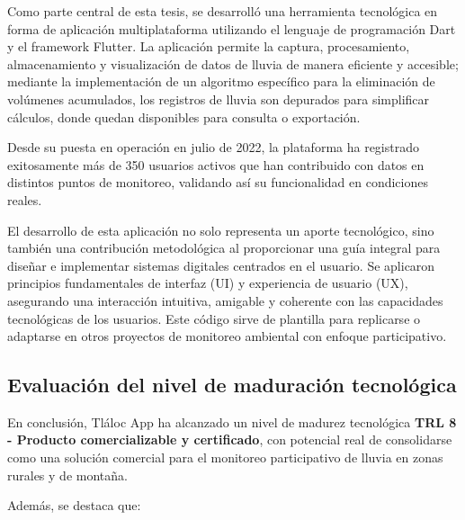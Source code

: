 Como parte central de esta tesis, se desarrolló una herramienta tecnológica en forma de aplicación multiplataforma utilizando el lenguaje de programación Dart y el framework Flutter. La aplicación permite la captura, procesamiento, almacenamiento y visualización de datos de lluvia de manera eficiente y accesible; mediante la implementación de un algoritmo específico para la eliminación de volúmenes acumulados, los registros de lluvia son depurados para simplificar cálculos, donde quedan disponibles para consulta o exportación.

Desde su puesta en operación en julio de 2022, la plataforma ha registrado exitosamente más de 350 usuarios activos que han contribuido con datos en distintos puntos de monitoreo, validando así su funcionalidad en condiciones reales. 

El desarrollo de esta aplicación no solo representa un aporte tecnológico, sino también una contribución metodológica al proporcionar una guía integral para diseñar e implementar sistemas digitales centrados en el usuario. Se aplicaron principios fundamentales de interfaz (UI) y experiencia de usuario (UX), asegurando una interacción intuitiva, amigable y coherente con las capacidades tecnológicas de los usuarios. Este código sirve de plantilla para replicarse o adaptarse en otros proyectos de monitoreo ambiental con enfoque participativo.


\subsection{Evaluación del nivel de maduración tecnológica}

En conclusión, Tláloc App ha alcanzado un nivel de madurez tecnológica \textbf{TRL 8 - Producto comercializable y certificado}, con potencial real de consolidarse como una solución comercial para el monitoreo participativo de lluvia en zonas rurales y de montaña.

Además, se destaca que:

